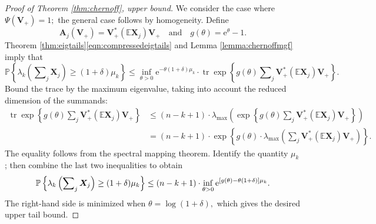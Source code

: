 \documentclass[11pt,letterpaper,twoside,reqno,nosumlimits]{amsart}
\renewcommand{\star}{*}
\newcommand{\mat}[1]{\ensuremath{\bm{#1}}} %
\newcommand{\e}{\ensuremath{\mathrm{e}}}
\newcommand{\E}{\ensuremath{\mathbb{E}}}
\newcommand{\Prob}[1]{\ensuremath{\mathbb{P}\left\{#1\right\}}}
\newcommand{\randcon}{\ensuremath{\Psi}}
\newcommand{\lambdamax}[1]{\ensuremath{\lambda_{\mathrm{max}}\left(#1\right)}}
\DeclareMathOperator{\tr}{tr}
\theoremstyle{remark}
\numberwithin{equation}{section}
\numberwithin{thm}{section}
\numberwithin{prop}{section}
\numberwithin{defn}{section}
\numberwithin{remark}{section}
\begin{document}
\begin{proof}[Proof of Theorem \ref{thm:chernoff}, upper bound]
We consider the case where $\randcon(\mat{V}_{+}) = 1;$ the general case follows by homogeneity.
Define 
$$ \mat{A}_j(\mat{V}_{+}) = \mat{V}_{+}^\star (\E \mat{X}_j) \mat{V}_{+} \quad \text{and}\quad  g(\theta) = \e^\theta - 1. $$
Theorem \ref{thm:eigtails}\eqref{eqn:compressedeigtails} and Lemma \ref{lemma:chernoffmgf} imply that 
\[
\Prob{\lambda_k\left(\sum\nolimits_j \mat{X}_j\right) \geq (1+\delta)\mu_k} \leq \inf_{\theta > 0} \e^{-\theta (1 + \delta)\mu_k} \cdot \tr\exp \left\{g(\theta) \sum\nolimits_j\mat{V}_{+}^\star (\E \mat{X}_j) \mat{V}_{+} \right\}. 
\]
Bound the trace by the maximum eigenvalue, taking into account the reduced dimension of the summands:
\begin{align*}
\tr\exp \left\{g(\theta) \sum\nolimits_j \mat{V}_{+}^\star(\E \mat{X}_j)\mat{V}_{+}\right\} & \leq (n-k+1)\cdot  \lambdamax{\exp\left\{g(\theta) \sum\nolimits_j \mat{V}_{+}^\star(\E \mat{X}_j)\mat{V}_{+}\right\}} \\
 & = (n-k+1) \cdot \exp\left\{g(\theta) \cdot \lambdamax{\sum\nolimits_j\mat{V}_{+}^\star(\E\mat{X}_j)\mat{V}_{+}}\right\}.
\end{align*}
The equality follows from the spectral mapping theorem. Identify the quantity $\mu_k$; then combine the last two inequalities to obtain
\[
 \Prob{\lambda_k\left(\sum\nolimits_j \mat{X}_j \right) \geq (1 + \delta)\mu_k} \leq \\
(n-k+1) \cdot \inf_{\theta >0 } \e^{[g(\theta) -\theta(1 + \delta)] \mu_k }. 
\]
The right-hand side is minimized when $\theta = \log(1+\delta),$ which gives the desired upper tail bound.
\end{proof}
\end{document}

